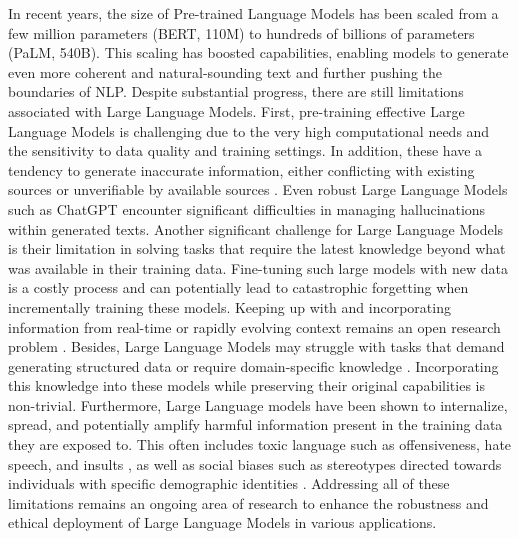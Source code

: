 In recent years, the size of Pre-trained Language Models has been scaled from a few million parameters (\ac{BERT}, 110M) to hundreds of billions of parameters (PaLM, 540B). This scaling has boosted capabilities, enabling models to generate even more coherent and natural-sounding text and further pushing the boundaries of \ac{NLP}. Despite substantial progress, there are still limitations associated with Large Language Models. First, pre-training effective Large Language Models is challenging due to the very high computational needs and the sensitivity to data quality and training settings. In addition, these have a tendency to generate inaccurate information, either conflicting with existing sources or unverifiable by available sources \citep{bang2023multitask}. Even robust Large Language Models such as ChatGPT encounter significant difficulties in managing hallucinations within generated texts. Another significant challenge for Large Language Models is their limitation in solving tasks that require the latest knowledge beyond what was available in their training data. Fine-tuning such large models with new data is a costly process and can potentially lead to catastrophic forgetting when incrementally training these models. Keeping up with and incorporating information from real-time or rapidly evolving context remains an open research problem \citep{yao2023editing}. Besides, Large Language Models may struggle with tasks that demand generating structured data \citep{jiang2023structgpt} or require domain-specific knowledge \citep{ye2023comprehensive}. Incorporating this knowledge into these models while preserving their original capabilities is non-trivial. Furthermore, Large Language models have been shown to internalize, spread, and potentially amplify harmful information present in the training data they are exposed to. This often includes toxic language such as offensiveness, hate speech, and insults \citep{gehman2020realtoxicityprompts}, as well as social biases such as stereotypes directed towards individuals with specific demographic identities \citep{sheng2021societal}. Addressing all of these limitations remains an ongoing area of research to enhance the robustness and ethical deployment of Large Language Models in various applications.




